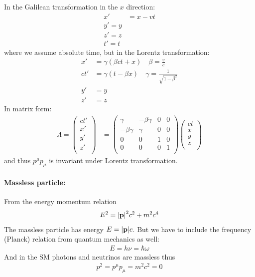 \documentclass[../main.tex]{subfiles}
\begin{document}
In the Galilean transformation in the $x$ direction:
\begin{align*}
    x' &= x - vt \\
    y' = y \\
    z' = z \\
    t' = t
\end{align*}
where we assume absolute time, but in the Lorentz transformation:
\begin{align*}
    x' &= \gamma(\beta ct + x) \quad \beta = \frac{v}{c} \\
    ct' &= \gamma(t - \beta x) \quad \gamma = \frac{1}{\sqrt{1 - \beta^2}} \\
    y' &= y \\
    z' &= z
\end{align*}
In matrix form:
\begin{align*}
    \Lambda = 
    \begin{pmatrix}
        ct' \\
        x' \\
        y' \\
        z' \\
    \end{pmatrix}
    &= \begin{pmatrix}
        \gamma & -\beta\gamma & 0 & 0 \\
        -\beta\gamma & \gamma & 0 & 0 \\
        0 & 0 & 1 & 0 \\
        0 & 0 & 0 & 1 \\
    \end{pmatrix}
    \begin{pmatrix}
        ct \\
        x \\
        y \\
        z \\
    \end{pmatrix}
\end{align*}
and thus $p^\mu p_\mu$ is invariant under Lorentz transformation.

\paragraph{Massless particle:} From the energy momentum relation
\begin{align*}
    E^2 = \abs{\vb{p}}^2 c^2 + m^2 c^4
\end{align*}
The massless particle has energy $E = \abs{\vb{p}}c$. But we have to include the frequency (Planck)
relation from quantum mechanics as well:
\begin{align*}
    E = h \nu = \hbar \omega
\end{align*}
And in the SM photons and neutrinos are massless thus
\begin{align*}
    p^2 = p^\mu p_\mu = m^2 c^2 = 0
\end{align*}
\end{document}
